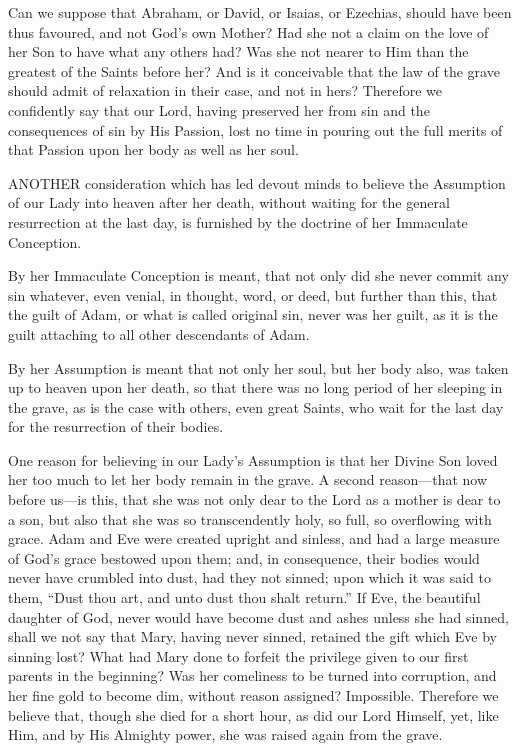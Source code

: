 Can we suppose that Abraham, or
David, or Isaias, or Ezechias, should have been thus favoured, and not
God's own Mother? Had she not a claim on the love of her Son to have
what any others had? Was she not nearer to Him than the greatest of the
Saints before her? And is it conceivable that the law of the grave
should admit of relaxation in their case, and not in hers? Therefore we
confidently say that our Lord, having preserved her from sin and the
consequences of sin by His Passion, lost no time in pouring out the full
merits of that Passion upon her body as well as her soul.



ANOTHER
consideration which has led devout minds to believe the Assumption of
our Lady into heaven after her death, without waiting for the general
resurrection at the last day, is furnished by the doctrine of her
Immaculate Conception.

By her Immaculate Conception is
meant, that not only did she never commit any sin whatever, even venial,
in thought, word, or deed, but further than this, that the guilt of
Adam, or what is called original sin, never was her guilt, as it is the
guilt attaching to all other descendants of Adam.

By her Assumption is meant that
not only her soul, but her body also, was taken up to heaven upon her
death, so that there was no long period of her sleeping in the grave, as
is the case with others, even great Saints, who wait for the last day
for the resurrection of their bodies.

One reason for believing in our
Lady's Assumption is that her Divine Son loved her too much to let
her body remain in the grave. A second reason—that now before us—is
this, that she was not only dear to the Lord as a mother is dear to a
son, but also that she was so transcendently holy, so full, so
overflowing with grace. Adam and Eve were created upright and sinless,
and had a large measure of God's grace bestowed upon them; and, in
consequence, their bodies would never have crumbled into dust, had they
not sinned; upon which it was said to them, ``Dust thou art, and unto
dust thou shalt return.'' If Eve, the beautiful daughter of God, never
would have become dust and ashes unless she had sinned, shall we not say
that Mary, having never sinned, retained the gift which Eve by sinning
lost? What had Mary done to forfeit the privilege given to our first
parents in the beginning? Was her comeliness to be turned into
corruption, and her fine gold to become dim, without reason assigned?
Impossible. Therefore we believe that, though she died for a short hour,
as did our Lord Himself, yet, like Him, and by His Almighty power, she
was raised again from the grave.

